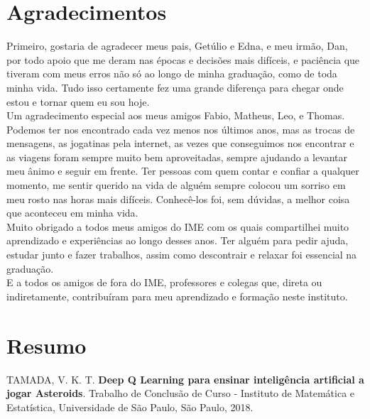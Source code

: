 \chapter*{Agradecimentos}
Primeiro, gostaria de agradecer meus pais, Getúlio e Edna, e meu irmão, Dan, por todo apoio que me deram nas épocas e decisões mais difíceis, e paciência que tiveram com meus erros não só ao longo de minha graduação, como de toda minha vida.
Tudo isso certamente fez uma grande diferença para chegar onde estou e tornar quem eu sou hoje.
\\

Um agradecimento especial aos meus amigos Fabio, Matheus, Leo, e Thomas.
Podemos ter nos encontrado cada vez menos nos últimos anos, mas as trocas de mensagens, as jogatinas pela internet, as vezes que conseguimos nos encontrar e as viagens foram sempre muito bem aproveitadas, sempre ajudando a levantar meu ânimo e seguir em frente.
Ter pessoas com quem contar e confiar a qualquer momento, me sentir querido na vida de alguém sempre colocou um sorriso em meu rosto nas horas mais difíceis.
Conhecê-los foi, sem dúvidas, a melhor coisa que aconteceu em minha vida.
\\

Muito obrigado a todos meus amigos do IME com os quais compartilhei muito aprendizado e experiências ao longo desses anos.
Ter alguém para pedir ajuda, estudar junto e fazer trabalhos, assim como descontrair e relaxar foi essencial na graduação.
\\

E a todos os amigos de fora do IME, professores e colegas que, direta ou indiretamente, contribuíram para meu aprendizado e formação neste instituto. 

\chapter*{Resumo}
%
\noindent%
TAMADA, V. K. T. \textbf{Deep Q Learning para ensinar inteligência artificial a jogar Asteroids}. Trabalho de Conclusão de Curso
 - Instituto de Matemática e Estatística, Universidade de São Paulo,
São Paulo, 2018.
\\

